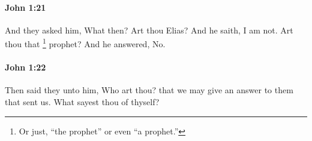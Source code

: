 		\paragraph{John 1:21} %
			\label{JOHN-1-21}

			And they asked him, What then? Art thou Elias? And he saith, I am not. Art thou that%
				\footnote{%
					Or just, ``the prophet'' or even ``a prophet.''
					}
			prophet? And he answered, No.

			\begin{framed}
			\scriptsize
				\begin{compactdesc}
					\item[SBLG] 
				\end{compactdesc}
			\end{framed}

		\paragraph{John 1:22} %
			\label{JOHN-1-22}

			Then said they unto him, Who art thou? that we may give an answer to them that sent us. What sayest thou of thyself?

